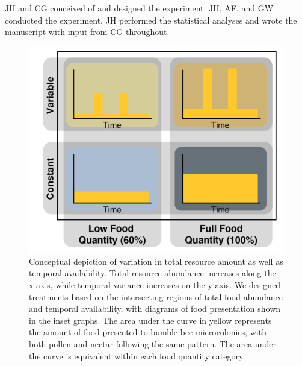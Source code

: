 \documentclass[11pt,]{article}
\begin{document}
JH and CG conceived of and designed the experiment. JH, AF, and GW
conducted the experiment. JH performed the statistical analyses and
wrote the manuscript with input from CG throughout.

\newpage

\begin{figure}
\centering
\includegraphics{./fig1_conceptual.png}
\caption{Conceptual depiction of variation in total resource amount as
well as temporal availability. Total resource abundance increases along
the x-axis, while temporal variance increases on the y-axis. We designed
treatments based on the intersecting regions of total food abundance and
temporal availability, with diagrams of food presentation shown in the
inset graphs. The area under the curve in yellow represents the amount
of food presented to bumble bee microcolonies, with both pollen and
nectar following the same pattern. The area under the curve is
equivalent within each food quantity category.}
\end{figure}

\clearpage

\newpage
\end{document}
